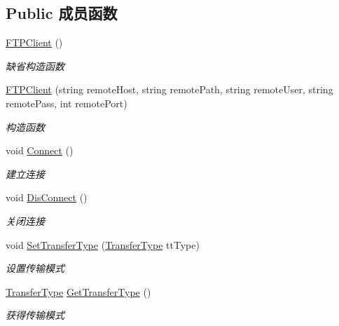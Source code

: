 \subsection*{Public 成员函数}
\begin{DoxyCompactItemize}
\item 
\hyperlink{class_x_c_l_net_tools_1_1_f_t_p_1_1_f_t_p_client_a676653f395ab68c5da43f284bf06a18e}{F\-T\-P\-Client} ()
\begin{DoxyCompactList}\small\item\em 缺省构造函数 \end{DoxyCompactList}\item 
\hyperlink{class_x_c_l_net_tools_1_1_f_t_p_1_1_f_t_p_client_a8ce62cd58f4f1825fcb38503fffd664c}{F\-T\-P\-Client} (string remote\-Host, string remote\-Path, string remote\-User, string remote\-Pass, int remote\-Port)
\begin{DoxyCompactList}\small\item\em 构造函数 \end{DoxyCompactList}\item 
void \hyperlink{class_x_c_l_net_tools_1_1_f_t_p_1_1_f_t_p_client_a80b5588cccdbc0fc599da3b065c17824}{Connect} ()
\begin{DoxyCompactList}\small\item\em 建立连接 \end{DoxyCompactList}\item 
void \hyperlink{class_x_c_l_net_tools_1_1_f_t_p_1_1_f_t_p_client_a68ed147abe1a9c0425e7168b37519979}{Dis\-Connect} ()
\begin{DoxyCompactList}\small\item\em 关闭连接 \end{DoxyCompactList}\item 
void \hyperlink{class_x_c_l_net_tools_1_1_f_t_p_1_1_f_t_p_client_a34ec9858385eb10edb576ee871a0e02f}{Set\-Transfer\-Type} (\hyperlink{class_x_c_l_net_tools_1_1_f_t_p_1_1_f_t_p_client_adef28404af1c916d9bd2bfbfa924b707}{Transfer\-Type} tt\-Type)
\begin{DoxyCompactList}\small\item\em 设置传输模式 \end{DoxyCompactList}\item 
\hyperlink{class_x_c_l_net_tools_1_1_f_t_p_1_1_f_t_p_client_adef28404af1c916d9bd2bfbfa924b707}{Transfer\-Type} \hyperlink{class_x_c_l_net_tools_1_1_f_t_p_1_1_f_t_p_client_abc5c0e7353bbbf20f1dcc1ee2f5d5c3f}{Get\-Transfer\-Type} ()
\begin{DoxyCompactList}\small\item\em 获得传输模式 \end{DoxyCompactList}\item 

\end{DoxyCompactItemize}
